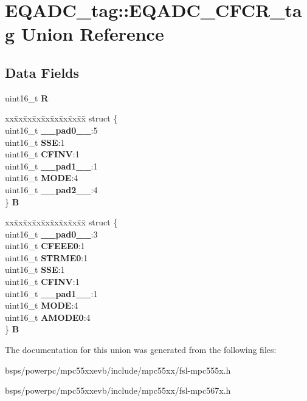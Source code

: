 \hypertarget{unionEQADC__tag_1_1EQADC__CFCR__tag}{}\section{E\+Q\+A\+D\+C\+\_\+tag\+::E\+Q\+A\+D\+C\+\_\+\+C\+F\+C\+R\+\_\+tag Union Reference}
\label{unionEQADC__tag_1_1EQADC__CFCR__tag}
\subsection*{Data Fields}
\begin{DoxyCompactItemize}
\item 
\mbox{\label{unionEQADC__tag_1_1EQADC__CFCR__tag_a31cd9e65be14cee53276e5cbb9be59dd}} 
uint16\+\_\+t {\bfseries R}
\item 
\mbox{\label{unionEQADC__tag_1_1EQADC__CFCR__tag_a7ce83b7209ace5c3027b5a220d5dc5f9}} 
\begin{tabbing}
xx\=xx\=xx\=xx\=xx\=xx\=xx\=xx\=xx\=\kill
struct \{\\
\>uint16\_t {\bfseries \_\_pad0\_\_}:5\\
\>uint16\_t {\bfseries SSE}:1\\
\>uint16\_t {\bfseries CFINV}:1\\
\>uint16\_t {\bfseries \_\_pad1\_\_}:1\\
\>uint16\_t {\bfseries MODE}:4\\
\>uint16\_t {\bfseries \_\_pad2\_\_}:4\\
\} {\bfseries B}\\

\end{tabbing}\item 
\mbox{\label{unionEQADC__tag_1_1EQADC__CFCR__tag_a65e0c1c716799905d1fd0b62de04c2ce}} 
\begin{tabbing}
xx\=xx\=xx\=xx\=xx\=xx\=xx\=xx\=xx\=\kill
struct \{\\
\>uint16\_t {\bfseries \_\_pad0\_\_}:3\\
\>uint16\_t {\bfseries CFEEE0}:1\\
\>uint16\_t {\bfseries STRME0}:1\\
\>uint16\_t {\bfseries SSE}:1\\
\>uint16\_t {\bfseries CFINV}:1\\
\>uint16\_t {\bfseries \_\_pad1\_\_}:1\\
\>uint16\_t {\bfseries MODE}:4\\
\>uint16\_t {\bfseries AMODE0}:4\\
\} {\bfseries B}\\

\end{tabbing}\end{DoxyCompactItemize}


The documentation for this union was generated from the following files\+:\begin{DoxyCompactItemize}
\item 
bsps/powerpc/mpc55xxevb/include/mpc55xx/fsl-\/mpc555x.\+h\item 
bsps/powerpc/mpc55xxevb/include/mpc55xx/fsl-\/mpc567x.\+h\end{DoxyCompactItemize}
